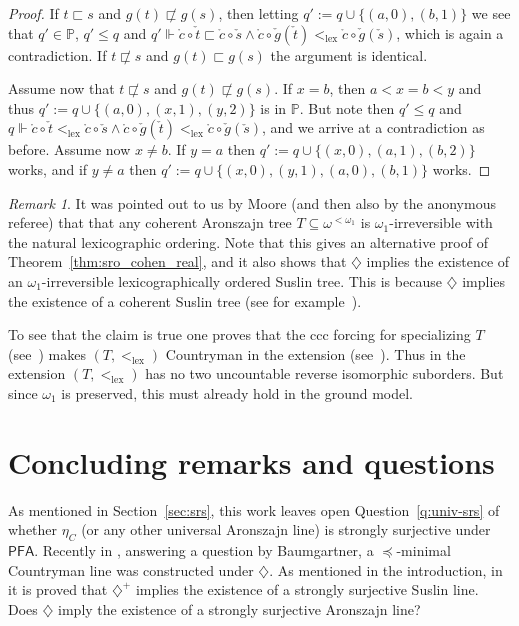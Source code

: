 \documentclass[10pt]{amsart}
\theoremstyle{definition}
\theoremstyle{remark}
\newtheorem{remark}[theorem]{Remark}
\newcommand{\seb}{\subseteq}
\newcommand{\axiom}[1]{\mathsf{#1}}
\newcommand{\PFA}{\axiom{PFA}}
\newcommand{\eleq}{\preceq}
\newcommand\lex{\mathrm{lex}}
\renewcommand{\P}{\mathbb{P}}
\newcommand{\1}{\mathbbm{1}}
\newcommand{\ck}[1]{\check{#1}}
\newcommand{\dt}[1]{\mathring{#1}}
\newcommand{\tle}{\sqsubset}
\begin{document}
\begin{proof}
  If $t \tle s$ and $g(t) \not\tle g(s)$, then
  letting $q' := q \cup \{(a,0),(b,1)\}$ we see that $q' \in \P$,
  $q' \le q$ and
  $q' \Vdash \dt{c} \circ \ck{t} \tle \dt{c} \circ \ck{s} \land
  \dt{c} \circ \ck{g}(\ck{t}) <_{\lex} \dt{c} \circ \ck{g}(\ck{s})$,
  which is again a contradiction.
  If $t \not\tle s$ and $g(t) \tle g(s)$ the argument is identical.

  Assume now that $t \not\tle s$ and $g(t) \not\tle g(s)$.
  If $x = b$,
  then $a < x = b < y$ and thus
  $q' := q \cup \{(a,0),(x,1),(y,2)\}$ is in $\P$. But note then
  $q' \le q$ and
  $q \Vdash \dt{c} \circ \ck{t} <_{\lex} \dt{c} \circ \ck{s}
  \land \dt{c} \circ \ck{g}(\ck{t}) <_{\lex} \dt{c} \circ \ck{g}(\ck{s})$,
  and we arrive at a contradiction as before. Assume now $x \neq b$.
  If $y = a$
  then $q' := q \cup \{(x,0),(a,1),(b,2)\}$ works, and if $y \neq a$
  then $q' := q \cup \{(x,0),(y,1),(a,0),(b,1)\}$ works.
\end{proof}

\begin{remark}\label{rmk:coherent-irrev}
  It was pointed out to us by Moore (and then also by the anonymous referee)
  that that any coherent Aronszajn
  tree $T \seb \omega^{<\omega_{1}}$ is $\omega_{1}$-irreversible
  with the natural lexicographic ordering. Note that this
  gives an alternative proof of Theorem~\ref{thm:sro_cohen_real}, and it also
  shows that $\diamondsuit$ implies the existence of an
  $\omega_{1}$-irreversible lexicographically ordered Suslin
  tree. This is because $\diamondsuit$ implies the existence of a
  coherent Suslin tree (see for
  example~\cite[Theorem~6.9]{Todorcevic1984}).

  To see that the claim is true one proves that the ccc forcing for
  specializing $T$ (see~\cite[Theorem~16.17]{Jech2003}) makes
  $(T,<_{\lex})$ Countryman in the extension
  (see~\cite[4.4]{TodorcevicWalks}).  Thus in the extension
  $(T,<_{\lex})$ has no two uncountable reverse isomorphic
  suborders. But since $\omega_{1}$ is preserved, this must already hold
  in the ground model.
\end{remark}

\section{Concluding remarks and questions}

As mentioned in Section~\ref{sec:srs}, this work leaves open
 Question~\ref{q:univ-srs} of whether $\eta_{C}$ (or any other universal Aronszajn line)
is strongly surjective under $\PFA$.
Recently in \cite{EisworthEtAl2023}, answering a question by
Baumgartner, a $\eleq$-minimal Countryman line was constructed under
$\diamondsuit$. As mentioned in the introduction,
in \cite{Soukup} it is proved that $\diamondsuit^{+}$ implies
the existence of a strongly surjective Suslin line. Does
$\diamondsuit$ imply the existence of a strongly surjective Aronszajn
line?
\end{document}
